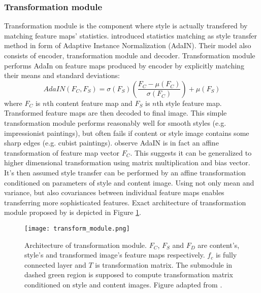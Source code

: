 \documentclass[../Main.tex]{subfiles}
\begin{document}
    \subsubsection{Transformation module} \label{transformation_module}
    Transformation module is the component where style is actually transfered
    by matching feature maps' statistics. \cite{huang2017adain} introduced
    statistics matching as style transfer method in form of Adaptive Instance
    Normalization (AdaIN). Their model also consists of encoder, transformation
    module and decoder. Transformation module performs AdaIn on feature maps
    produced by encoder by explicitly matching their means and standard deviations:
    \[ AdaIN(F_C, F_S) = \sigma(F_S)\left( \frac{F_C - \mu(F_C)}{\sigma(F_C)}\right)+\mu(F_S) \]
    where $F_C$ is $n$th content feature map and $F_S$ is $n$th style feature map.
    Transformed feature maps are then decoded to final image. This simple transformation 
    module performs reasonably well for smooth styles (e.g. impressionist paintings),
    but often fails if content or style image contains some sharp edges 
    (e.g. cubist paintings). \cite{Li2018} observe
    AdaIN is in fact an affine transformation of feature map vector $F_C$. 
    This suggests it can be generalized to higher dimensional transformation 
    using matrix multiplication and bias vector. It's then assumed style transfer
    can be performed by an affine transformation conditioned on parameters 
    of style and content image. Using not only mean and variance, but also 
    covariances between individual feature maps enables transferring 
    more sophisticated features. Exact architecture of
    transformation module proposed by \cite{Li2018} is depicted in Figure
    \ref{fig:transform_module}. 
    
        \begin{figure}[h!]
        \centering
            \texttt{[image: transform\_module.png]}
            \caption{Architecture of transformation module. $F_C$, $F_S$ and $F_D$
            are content's, style's and transformed image's feature maps respectively.
            $f_c$ is fully connected layer and $T$ is transformation matrix. 
            The submodule in dashed green region is supposed to compute 
            transformation matrix conditioned on style and content images.
            Figure adapted from \cite{Li2018}.
            }
            \label{fig:transform_module}
        \end{figure}
        
\end{document}

